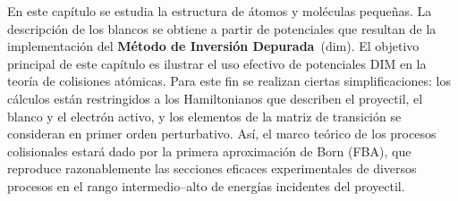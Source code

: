 En este capítulo se estudia la estructura de átomos y moléculas pequeñas. 
La descripción de los blancos se obtiene a partir de potenciales que 
resultan de la implementación del \textbf{Método de Inversión 
Depurada}~(\acs{dim}). 
El objetivo principal de este capítulo es ilustrar el uso efectivo de 
potenciales DIM en la teoría de colisiones atómicas. Para este fin 
se realizan ciertas simplificaciones: los cálculos están restringidos a 
los Hamiltonianos que describen el proyectil, el blanco y el electrón 
activo, y los elementos de la matriz de transición se consideran en 
primer orden perturbativo. 
Así, el marco teórico de los procesos colisionales estará dado por la 
primera aproximación de Born (FBA), que reproduce razonablemente las 
secciones eficaces experimentales de diversos procesos en el rango 
intermedio--alto de energías incidentes del proyectil. 


